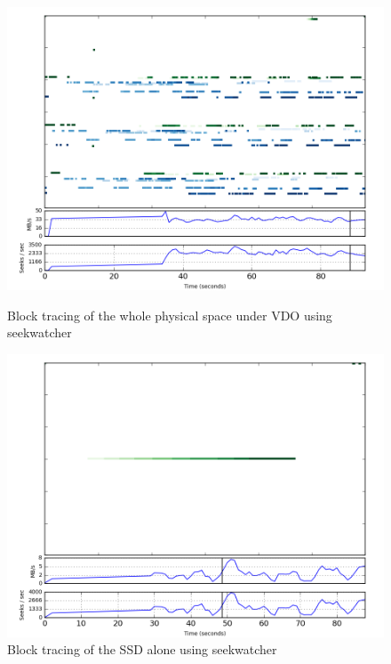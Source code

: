 \documentclass[
  color, %
  table, %
  lof,   %
  lot,   %
]{fithesis3}
\begin{document}
\begin{figure}[!htb]
        \centering
        \includegraphics[width=\textwidth]{../results/journal/seeks/snaps/ssd_testlv}
\caption[Journal]{Block tracing of the whole physical space under VDO using seekwatcher}
\label{fig:journal-LV}
        \centering
        \includegraphics[width=\textwidth]{../results/journal/seeks/snaps/ssd}
\caption[Journal]{Block tracing of the SSD alone using seekwatcher}
\label{fig:journal-SSD}
\end{figure}
\end{document}
